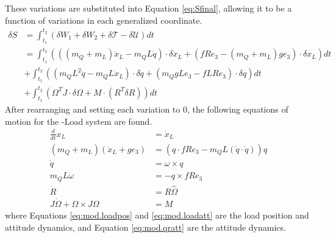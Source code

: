 
These variations are substituted into Equation \ref{eq:Sfinal}, allowing it to be a function of variations in each generalized coordinate.
\begin{equation}\label{eq:Sfinalfilled}
\begin{aligned}
\delta S &= \int_{t_1}^{t_2}(\delta W_1+\delta W_2+\delta\mathcal{T}-\delta\mathcal{U})dt\\
&=\int_{t_1}^{t_2}(((m_Q+m_L)\dot{x}_L-m_QL\dot{q})\cdot\delta\dot{x}_L+(fRe_3-(m_Q+m_L)ge_3)\cdot\delta x_L)dt\\
&+\int_{t_1}^{t_2}((m_QL^2\dot{q}-m_QL\dot{x}_L)\cdot\delta\dot{q}+(m_QgLe_3-fLRe_3)\cdot\delta q)dt\\
&+\int_{t_1}^{t_2}(\Omega^TJ \cdot \delta\Omega+M\cdot(R^T\delta R))dt
\end{aligned}
\end{equation}
After rearranging and setting each variation to 0, the following equations of motion for the -Load system are found. 
\begin{align}
\frac{d}{dt} x_L &=\dot{x}_L\\
(m_Q+m_L)(\ddot{x}_L+ge_3)&=(q\cdot fRe_3-m_QL(\dot{q}\cdot\dot{q}))q\label{eq:mod.loadpos}\\
\dot{q}&=\omega\times q\\
m_QL\dot{\omega}&=-q\times fRe_3\label{eq:mod.loadatt}\\
\dot{R}&=R\hat{\Omega} \label{eq:mod.R}\\ 
J\dot{\Omega}+\Omega\times J\Omega&= M \label{eq:mod.qratt}
\end{align}
where Equations \ref{eq:mod.loadpos} and \ref{eq:mod.loadatt} are the load position and attitude dynamics, and Equation \ref{eq:mod.qratt} are the  attitude dynamics.\\

